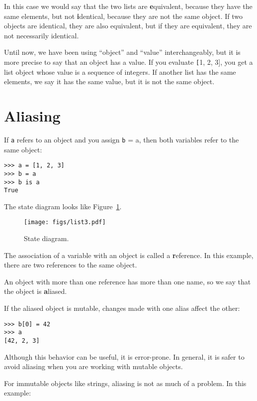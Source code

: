 \documentclass[
DIV=11,
fontsize=12,
twoside,
headinclude=false,
titlepage=firstiscover,
abstract=true,
headsepline=true,
footsepline=true,
chapterprefix=true, %
headings=big,
bibliography=totoc,%
captions=tableheading
]{scrbook}
\theoremstyle{definition}
\begin{document}
In this case we would say that the two lists are {\textbf equivalent},
because they have the same elements, but not {\textbf identical}, because
they are not the same object.  If two objects are identical, they are
also equivalent, but if they are equivalent, they are not necessarily
identical.

Until now, we have been using ``object'' and ``value''
interchangeably, but it is more precise to say that an object has a
value.  If you evaluate {\texttt [1, 2, 3]}, you get a list
object whose value is a sequence of integers.  If another
list has the same elements, we say it has the same value, but
it is not the same object.


\section{Aliasing}

If {\texttt a} refers to an object and you assign {\texttt b = a},
then both variables refer to the same object:

\begin{lstlisting}
>>> a = [1, 2, 3]
>>> b = a
>>> b is a
True
\end{lstlisting}
%
The state diagram looks like Figure~\ref{fig.list3}.

\begin{figure}
\centerline
{\texttt{[image: figs/list3.pdf]}}
\caption{State diagram.}
\label{fig.list3}
\end{figure}

The association of a variable with an object is called a {\textbf
reference}.  In this example, there are two references to the same
object.

An object with more than one reference has more
than one name, so we say that the object is {\textbf aliased}.

If the aliased object is mutable, changes made with one alias affect
the other:

\begin{lstlisting}
>>> b[0] = 42
>>> a
[42, 2, 3]
\end{lstlisting}
%
Although this behavior can be useful, it is error-prone.  In general,
it is safer to avoid aliasing when you are working with mutable
objects.

For immutable objects like strings, aliasing is not as much of a
problem.  In this example:
\end{document}
